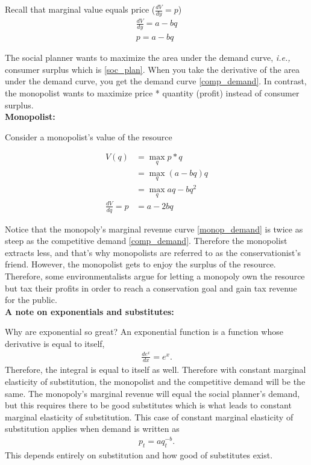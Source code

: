 \documentclass[12pt]{article}
\begin{document}
Recall that marginal value equals price ($\frac{dV}{dy} = p$)
\begin{align}
    \frac{dV}{dy} = a- bq\\
    p = a -bq \label{comp_demand} 
\end{align}

The social planner wants to maximize the area under the demand curve, \textit{i.e.,} consumer surplus which is \ref{soc_plan}. When you take the derivative of the area under the demand curve, you get the demand curve \ref{comp_demand}. In contrast, the monopolist wants to maximize price * quantity (profit) instead of consumer surplus. \\

\textbf{Monopolist:}

Consider a monopolist's value of the resource

\begin{align}
    V(q) &= \max_q p*q \\
    &= \max_q (a -bq)q\\
    &= \max_q aq - bq^2\\
    \frac{dV}{dq} = p &= a - 2bq \label{monop_demand}
\end{align}

Notice that the monopoly's marginal revenue curve \ref{monop_demand} is twice as steep as the competitive demand \ref{comp_demand}. Therefore the monopolist extracts less, and that's why monopolists are referred to as the  conservationist's friend. However, the monopolist gets to enjoy the surplus of the resource. Therefore, some environmentalists argue for letting a monopoly own the resource but tax their profits in order to reach a conservation goal and gain tax revenue for the public. \\


\textbf{A note on exponentials and substitutes:}

Why are exponential so great? An exponential function is a function whose derivative is equal to itself, 
\begin{align}
    \frac{d e^x}{dx} = e^x.
\end{align}
Therefore, the integral is equal to itself as well. Therefore with constant marginal elasticity of substitution, the monopolist and the competitive demand will be the same. The monopoly's marginal revenue will equal the social planner's demand, but this requires there to be good substitutes which is what leads to constant marginal elasticity of substitution. This case of constant marginal elasticity of substitution applies when demand is written as 
\begin{align}
    p_t = a q_t^{-b}.
\end{align}
This depends entirely on substitution and how good of substitutes exist. 
\end{document}
